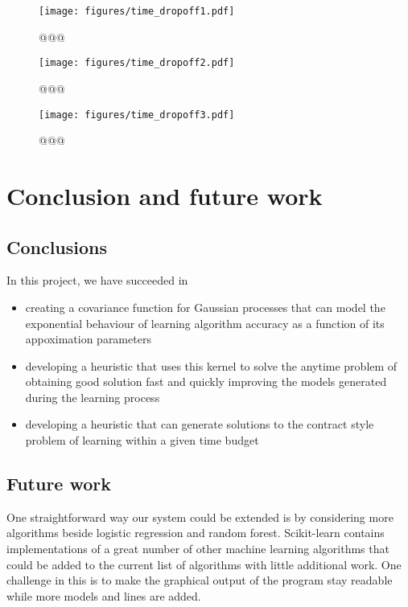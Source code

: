\documentclass[a4paper,12pt,twoside,openright]{report}
\begin{document}
\begin{figure}
\centering
  \texttt{[image: figures/time\_dropoff1.pdf]}
  \caption{@@@}
  \label{time_dropoff1}
\end{figure}
\begin{figure}
\centering
  \texttt{[image: figures/time\_dropoff2.pdf]}
  \caption{@@@}
  \label{time_dropoff2}
\end{figure}
\begin{figure}
\centering
  \texttt{[image: figures/time\_dropoff3.pdf]}
  \caption{@@@}
  \label{time_dropoff3}
\end{figure}



\chapter{Conclusion and future work} 
\section{Conclusions}
In this project, we have succeeded in
\begin{itemize}
	\item creating a covariance function for Gaussian processes that can model the exponential behaviour of learning algorithm accuracy as a function of its appoximation parameters
	\item developing a heuristic that uses this kernel to solve the anytime problem of obtaining good solution fast and quickly improving the models generated during the learning process
	\item developing a heuristic that can generate solutions to the contract style problem of learning within a given time budget
\end{itemize}


\section{Future work}
One straightforward way our system could be extended is by considering more algorithms beside logistic regression and random forest. Scikit-learn contains implementations of a great number of other machine learning algorithms that could be added to the current list of algorithms with little additional work. One challenge in this is to make the graphical output of the program stay readable while more models and lines are added.
\end{document}
